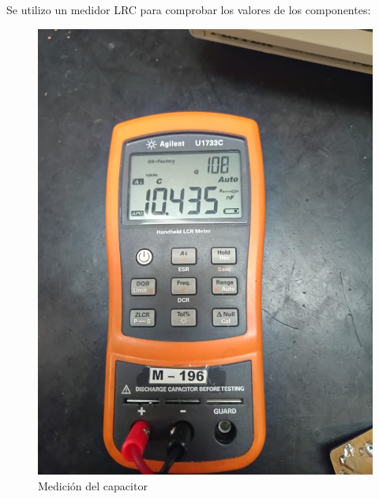 Se utilizo un medidor LRC para comprobar los valores de los componentes: 
\begin{figure}[H]
    \begin{minipage}{0.49\textwidth}
    \centering
    \includegraphics[width=\textwidth]{Imagenes/MedCapExp3.jpeg}
    \caption{Medición del capacitor}
    \end{minipage}
    \begin{minipage}{0.49\textwidth}
    \centering

\end{minipage}
\end{figure}
